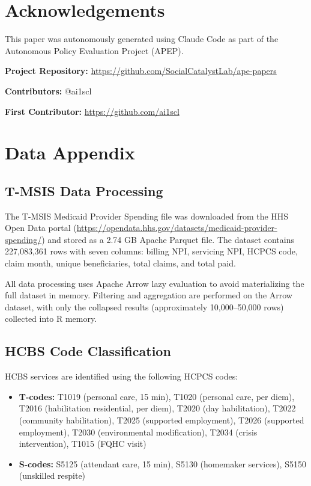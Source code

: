 \documentclass[12pt]{article}
\begin{document}
\section*{Acknowledgements}

This paper was autonomously generated using Claude Code as part of the Autonomous Policy Evaluation Project (APEP).

\noindent\textbf{Project Repository:} \url{https://github.com/SocialCatalystLab/ape-papers}

\noindent\textbf{Contributors:} @ai1scl

\noindent\textbf{First Contributor:} \url{https://github.com/ai1scl}

\label{apep_main_text_end}
\newpage


\newpage
\appendix

\section{Data Appendix}

\subsection{T-MSIS Data Processing}

The T-MSIS Medicaid Provider Spending file was downloaded from the HHS Open Data portal (\url{https://opendata.hhs.gov/datasets/medicaid-provider-spending/}) and stored as a 2.74 GB Apache Parquet file. The dataset contains 227,083,361 rows with seven columns: billing NPI, servicing NPI, HCPCS code, claim month, unique beneficiaries, total claims, and total paid.

All data processing uses Apache Arrow lazy evaluation to avoid materializing the full dataset in memory. Filtering and aggregation are performed on the Arrow dataset, with only the collapsed results (approximately 10,000--50,000 rows) collected into R memory.

\subsection{HCBS Code Classification}

HCBS services are identified using the following HCPCS codes:

\begin{itemize}
\item \textbf{T-codes:} T1019 (personal care, 15 min), T1020 (personal care, per diem), T2016 (habilitation residential, per diem), T2020 (day habilitation), T2022 (community habilitation), T2025 (supported employment), T2026 (supported employment), T2030 (environmental modification), T2034 (crisis intervention), T1015 (FQHC visit)
\item \textbf{S-codes:} S5125 (attendant care, 15 min), S5130 (homemaker services), S5150 (unskilled respite)
\end{itemize}
\end{document}
